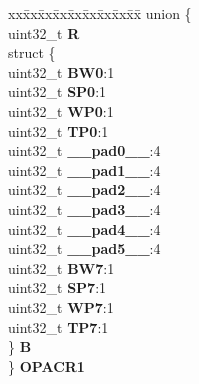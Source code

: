 \begin{DoxyCompactItemize}
\begin{tabbing}
\end{tabbing}\item 
\mbox{\label{structPBRIDGE__A__tag_a3a0f7c7e270893eedb3a7fda693c103a}} 
\begin{tabbing}
xx\=xx\=xx\=xx\=xx\=xx\=xx\=xx\=xx\=\kill
union \{\\
\>uint32\_t {\bfseries R}\\
\>struct \{\\
\>\>uint32\_t {\bfseries BW0}:1\\
\>\>uint32\_t {\bfseries SP0}:1\\
\>\>uint32\_t {\bfseries WP0}:1\\
\>\>uint32\_t {\bfseries TP0}:1\\
\>\>uint32\_t {\bfseries \_\_pad0\_\_}:4\\
\>\>uint32\_t {\bfseries \_\_pad1\_\_}:4\\
\>\>uint32\_t {\bfseries \_\_pad2\_\_}:4\\
\>\>uint32\_t {\bfseries \_\_pad3\_\_}:4\\
\>\>uint32\_t {\bfseries \_\_pad4\_\_}:4\\
\>\>uint32\_t {\bfseries \_\_pad5\_\_}:4\\
\>\>uint32\_t {\bfseries BW7}:1\\
\>\>uint32\_t {\bfseries SP7}:1\\
\>\>uint32\_t {\bfseries WP7}:1\\
\>\>uint32\_t {\bfseries TP7}:1\\
\>\} {\bfseries B}\\
\} {\bfseries OPACR1}\\


\end{tabbing}
\end{DoxyCompactItemize}
